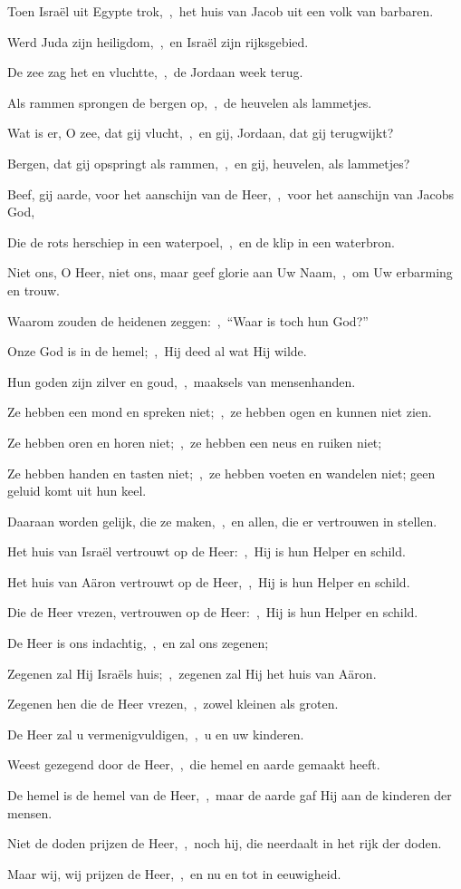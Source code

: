 \documentclass[12pt,twoside,a5paper]{article}
\begin{document}
\begin{halfparskip}
   Toen Israël uit Egypte trok,~\sep\ het huis van Jacob uit een volk van barbaren.

  Werd Juda zijn heiligdom,~\sep\ en Israël zijn rijksgebied.

  De zee zag het en vluchtte,~\sep\ de Jordaan week terug.

  Als rammen sprongen de bergen op,~\sep\ de heuvelen als lammetjes.

  Wat is er, O zee, dat gij vlucht,~\sep\ en gij, Jordaan, dat gij terugwijkt?

  Bergen, dat gij opspringt als rammen,~\sep\ en gij, heuvelen, als lammetjes?

  Beef, gij aarde, voor het aanschijn van de Heer,~\sep\ voor het aanschijn van Jacobs God,

  Die de rots herschiep in een waterpoel,~\sep\ en de klip in een waterbron.

   Niet ons, O Heer, niet ons, maar geef glorie aan Uw Naam,~\sep\ om Uw erbarming en trouw.

  Waarom zouden de heidenen zeggen:~\sep\ ``Waar is toch hun God?''

  Onze God is in de hemel;~\sep\ Hij deed al wat Hij wilde.

  Hun goden zijn zilver en goud,~\sep\ maaksels van mensenhanden.

  Ze hebben een mond en spreken niet;~\sep\ ze hebben ogen en kunnen niet zien.

  Ze hebben oren en horen niet;~\sep\ ze hebben een neus en ruiken niet;

  Ze hebben handen en tasten niet;~\sep\ ze hebben voeten en wandelen niet; geen geluid komt uit hun keel.

  Daaraan worden gelijk, die ze maken,~\sep\ en allen, die er vertrouwen in stellen.

  Het huis van Israël vertrouwt op de Heer:~\sep\ Hij is hun Helper en schild.

  Het huis van Aäron vertrouwt op de Heer,~\sep\ Hij is hun Helper en schild.

  Die de Heer vrezen, vertrouwen op de Heer:~\sep\ Hij is hun Helper en schild.

  De Heer is ons indachtig,~\sep\ en zal ons zegenen;

  Zegenen zal Hij Israëls huis;~\sep\ zegenen zal Hij het huis van Aäron.

  Zegenen hen die de Heer vrezen,~\sep\ zowel kleinen als groten.

  De Heer zal u vermenigvuldigen,~\sep\ u en uw kinderen.

  Weest gezegend door de Heer,~\sep\ die hemel en aarde gemaakt heeft.

  De hemel is de hemel van de Heer,~\sep\ maar de aarde gaf Hij aan de kinderen der mensen.

  Niet de doden prijzen de Heer,~\sep\ noch hij, die neerdaalt in het rijk der doden.

  Maar wij, wij prijzen de Heer,~\sep\ en nu en tot in eeuwigheid.
\end{halfparskip}
\end{document}
